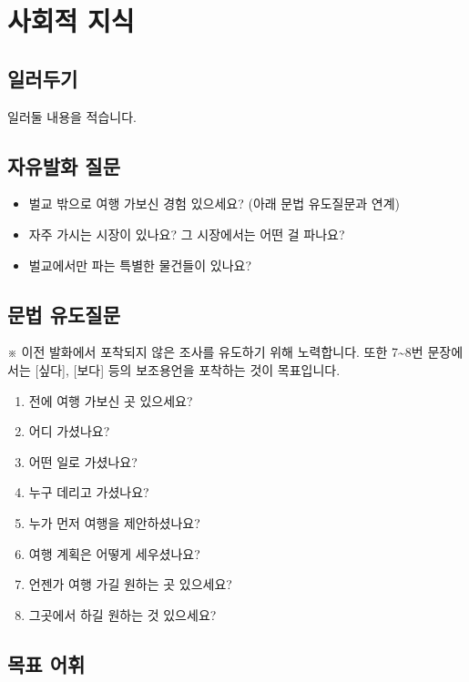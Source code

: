 \section{사회적 지식}
\subsection{일러두기}
일러둘 내용을 적습니다.

\subsection{자유발화 질문}
\begin{itemize}[noitemsep]
  \item 벌교 밖으로 여행 가보신 경험 있으세요? (아래 문법 유도질문과 연계)
  \item 자주 가시는 시장이 있나요? 그 시장에서는 어떤 걸 파나요? 
  \item 벌교에서만 파는 특별한 물건들이 있나요?
\end{itemize}

\subsection{문법 유도질문}
※ 이전 발화에서 포착되지 않은 조사를 유도하기 위해 노력합니다.
또한 7{\textasciitilde}8번 문장에서는 [싶다], [보다] 등의 보조용언을 포착하는 것이 목표입니다.

\begin{enumerate}[noitemsep]
  \item 전에 여행 가보신 곳 있으세요?
  \item 어디 가셨나요?
  \item 어떤 일로 가셨나요?
  \item 누구 데리고 가셨나요?
  \item 누가 먼저 여행을 제안하셨나요?
  \item 여행 계획은 어떻게 세우셨나요?
  \item 언젠가 여행 가길 원하는 곳 있으세요?
  \item 그곳에서 하길 원하는 것 있으세요?
\end{enumerate}

\subsection{목표 어휘}
%

